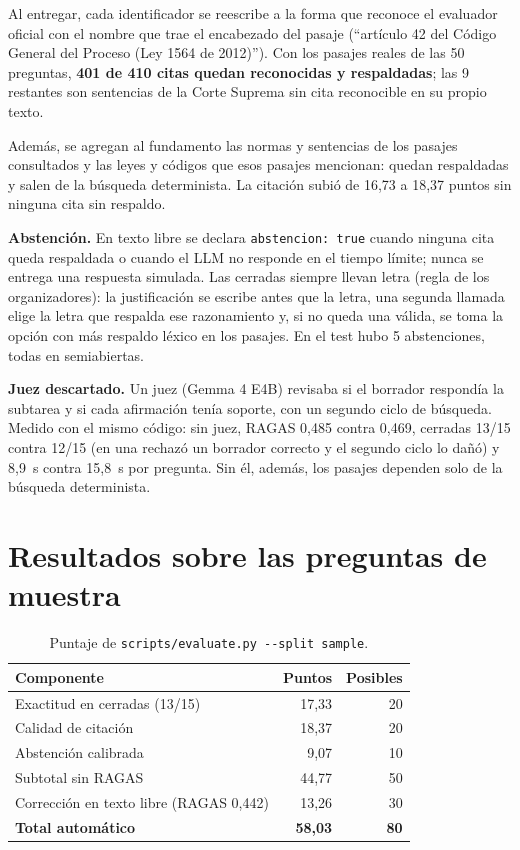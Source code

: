 \documentclass[10pt,twocolumn,letterpaper]{article}
\newcommand{\cod}[1]{\texttt{#1}}
\begin{document}
Al entregar, cada identificador se reescribe a la forma que reconoce el evaluador
oficial con el nombre que trae el encabezado del pasaje (``artículo 42 del Código
General del Proceso (Ley 1564 de 2012)''). Con los pasajes reales de las 50 preguntas,
\textbf{401 de 410 citas quedan reconocidas y respaldadas}; las 9 restantes son
sentencias de la Corte Suprema sin cita reconocible en su propio texto.

Además, se agregan al fundamento las normas y sentencias de los pasajes consultados y
las leyes y códigos que esos pasajes mencionan: quedan respaldadas y salen de la
búsqueda determinista. La citación subió de 16,73 a 18,37 puntos sin ninguna cita sin
respaldo.

\textbf{Abstención.} En texto libre se declara \cod{abstencion: true} cuando ninguna
cita queda respaldada o cuando el LLM no responde en el tiempo límite; nunca se entrega
una respuesta simulada. Las cerradas siempre llevan letra (regla de los organizadores):
la justificación se escribe antes que la letra, una segunda llamada elige la letra que
respalda ese razonamiento y, si no queda una válida, se toma la opción con más respaldo
léxico en los pasajes. En el test hubo 5 abstenciones, todas en semiabiertas.

\textbf{Juez descartado.} Un juez (Gemma 4 E4B) revisaba si el borrador respondía la
subtarea y si cada afirmación tenía soporte, con un segundo ciclo de búsqueda. Medido
con el mismo código: sin juez, RAGAS 0,485 contra 0,469, cerradas 13/15 contra 12/15 (en
una rechazó un borrador correcto y el segundo ciclo lo dañó) y 8,9~s contra 15,8~s por
pregunta. Sin él, además, los pasajes dependen solo de la búsqueda determinista.

\section{Resultados sobre las preguntas de muestra}

\begin{table}[!ht]
\centering\footnotesize
\caption{Puntaje de \cod{scripts/evaluate.py -{}-split sample}.}
\label{tab:resultados}
\begin{tabular}{@{}lrr@{}}
\toprule
Componente & Puntos & Posibles \\
\midrule
Exactitud en cerradas (13/15) & 17,33 & 20 \\
Calidad de citación           & 18,37 & 20 \\
Abstención calibrada          &  9,07 & 10 \\
\midrule
Subtotal sin RAGAS & 44,77 & 50 \\
Corrección en texto libre (RAGAS 0,442) & 13,26 & 30 \\
\midrule
\textbf{Total automático} & \textbf{58,03} & \textbf{80} \\
\bottomrule
\end{tabular}
\end{table}
\end{document}
